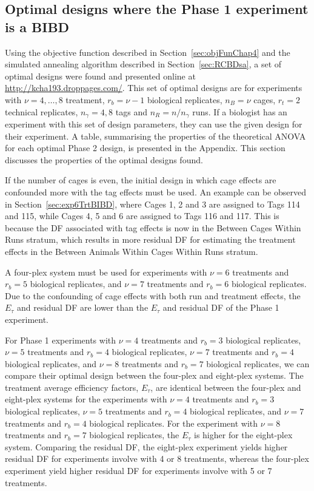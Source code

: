 \subsection{Optimal designs where the Phase 1 experiment is a BIBD}
\label{sec:overSumBIBD}
Using the objective function described in Section~\ref{sec:objFunChap4} and the simulated annealing algorithm described in Section~\ref{sec:RCBDsa}, a set of optimal designs were found and presented online at \url{http://kcha193.droppages.com/}. This set of optimal designs are for experiments with $\nu = 4,\dots,8$ treatment, $r_b = \nu -1$ biological replicates, $n_B =\nu $ cages, $r_t = 2$ technical replicates, $n_\gamma = 4, 8$ tags and $n_R = n/n_\gamma$ runs. If a biologist has an experiment with this set of design parameters, they can use the given design for their experiment. A table, summarising the properties of the theoretical ANOVA for each optimal Phase 2 design, is presented in the Appendix. This section discusses the properties of the optimal designs found. 

If the number of cages is even, the initial design in which cage effects are confounded more with the tag effects must be used. An example can be observed in Section~\ref{sec:exp6TrtBIBD}, where Cages 1, 2 and 3 are assigned to Tags 114 and 115, while Cages 4, 5 and 6 are assigned to Tags 116 and 117. This is because the DF associated with tag effects is now in the Between Cages Within Runs stratum, which results in more residual DF for estimating the treatment effects in the Between Animals Within Cages Within Runs stratum. 

A four-plex system must be used for experiments with $\nu = 6$ treatments and $r_b = 5$ biological replicates, and $\nu = 7$ treatments and $r_b = 6$ biological replicates. Due to the confounding of cage effects with both run and treatment effects, the $E_\tau$ and residual DF are lower than the $E_\tau$ and residual DF of the Phase 1 experiment. 

For Phase 1 experiments with $\nu = 4$ treatments and $r_b = 3$ biological replicates, $\nu = 5$ treatments and $r_b = 4$ biological replicates, $\nu = 7$ treatments and $r_b = 4$ biological replicates, and $\nu = 8$ treatments and $r_b = 7$ biological replicates, we can compare their optimal design between the four-plex and eight-plex systems. The treatment average efficiency factors, $E_\tau$, are identical between the four-plex and eight-plex systems for the experiments with $\nu = 4$ treatments and $r_b = 3$ biological replicates, $\nu = 5$ treatments and $r_b = 4$ biological replicates, and $\nu = 7$ treatments and $r_b = 4$ biological replicates. For the experiment with $\nu = 8$ treatments and $r_b = 7$ biological replicates, the $E_\tau$ is higher for the eight-plex system. Comparing the residual DF, the eight-plex experiment yields higher residual DF for experiments involve with 4 or 8 treatments, whereas the four-plex experiment yield higher residual DF for experiments involve with 5 or 7 treatments.

